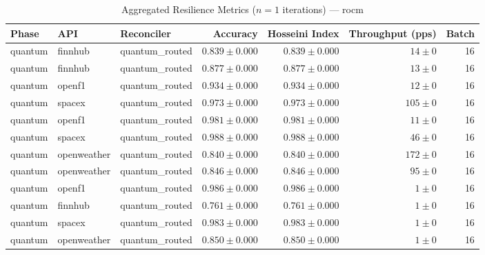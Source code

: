 
\begin{table}[htbp]
\caption{Aggregated Resilience Metrics ($n=1$ iterations) --- rocm}
\begin{tabular}{l l l r r r r}
\hline
Phase & API & Reconciler & Accuracy & Hosseini Index & Throughput (pps) & Batch \\
\hline
quantum & finnhub & quantum\_routed & $0.839\pm0.000$ & $0.839\pm0.000$ & $14\pm0$ & 16 \\
quantum & finnhub & quantum\_routed & $0.877\pm0.000$ & $0.877\pm0.000$ & $13\pm0$ & 16 \\
quantum & openf1 & quantum\_routed & $0.934\pm0.000$ & $0.934\pm0.000$ & $12\pm0$ & 16 \\
quantum & spacex & quantum\_routed & $0.973\pm0.000$ & $0.973\pm0.000$ & $105\pm0$ & 16 \\
quantum & openf1 & quantum\_routed & $0.981\pm0.000$ & $0.981\pm0.000$ & $11\pm0$ & 16 \\
quantum & spacex & quantum\_routed & $0.988\pm0.000$ & $0.988\pm0.000$ & $46\pm0$ & 16 \\
quantum & openweather & quantum\_routed & $0.840\pm0.000$ & $0.840\pm0.000$ & $172\pm0$ & 16 \\
quantum & openweather & quantum\_routed & $0.846\pm0.000$ & $0.846\pm0.000$ & $95\pm0$ & 16 \\
quantum & openf1 & quantum\_routed & $0.986\pm0.000$ & $0.986\pm0.000$ & $1\pm0$ & 16 \\
quantum & finnhub & quantum\_routed & $0.761\pm0.000$ & $0.761\pm0.000$ & $1\pm0$ & 16 \\
quantum & spacex & quantum\_routed & $0.983\pm0.000$ & $0.983\pm0.000$ & $1\pm0$ & 16 \\
quantum & openweather & quantum\_routed & $0.850\pm0.000$ & $0.850\pm0.000$ & $1\pm0$ & 16 \\
\hline
\end{tabular}
\end{table}
